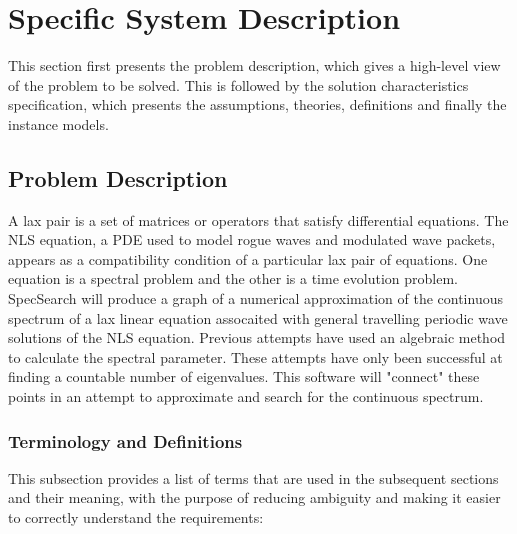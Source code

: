 \documentclass[12pt]{article}
\begin{document}
\section{Specific System Description}

This section first presents the problem description, which gives a high-level
view of the problem to be solved.  This is followed by the solution 
characteristics specification, which presents the assumptions, theories, 
definitions and finally the instance models. 

\subsection{Problem Description} \label{Sec_pd}
A lax pair is a set of matrices or operators that satisfy differential 
equations. The NLS equation, a PDE used to model rogue waves and modulated wave 
packets, appears as a compatibility condition of a particular lax pair of 
equations. One equation is a spectral problem and the other is a time 
evolution problem.  \\

SpecSearch will produce a graph of a numerical approximation of the continuous 
spectrum of a lax linear equation assocaited with general travelling periodic 
wave solutions of the NLS equation. Previous attempts have used an algebraic 
method to calculate the spectral parameter. These attempts have only been 
successful at finding a countable number of eigenvalues. This software will 
"connect" these points in an attempt to approximate and search for the 
continuous spectrum. \\ 

\subsubsection{Terminology and  Definitions}

This subsection provides a list of terms that are used in the subsequent
sections and their meaning, with the purpose of reducing ambiguity and making it
easier to correctly understand the requirements:
\end{document}
